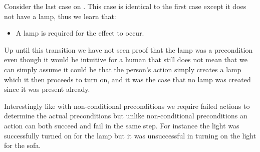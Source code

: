 \documentclass[../Master.tex]{subfiles}
\begin{document}
\begin{example}\label{ex:ca:light-on-3}
    Consider the last case on . This case is identical to the first case except it does not have a lamp, thus we learn that:
    \begin{itemize}
        \item A lamp is required for the effect to occur.
    \end{itemize}
    Up until this transition we have not seen proof that the lamp was a precondition even though it would be intuitive for a human that still does not mean that we can simply assume it could be that the person's action simply creates a lamp which it then proceeds to turn on, and it was the case that no lamp was created since it was present already.
    
    Interestingly like with non-conditional preconditions we require failed actions to determine the actual preconditions but unlike non-conditional preconditions an action can both succeed and fail in the same step. For instance the light was successfully turned on for the lamp but it was unsuccessful in turning on the light for the sofa.

\end{example}
\end{document}
